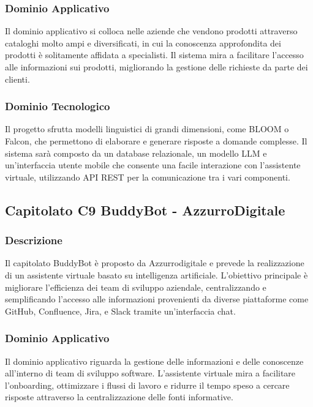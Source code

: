 \documentclass{article}
\begin{document}
\subsubsection{Dominio Applicativo}
Il dominio applicativo si colloca nelle aziende che vendono prodotti attraverso 
cataloghi molto ampi e diversificati, in cui la conoscenza approfondita dei prodotti è 
solitamente affidata a specialisti. Il sistema mira a facilitare l'accesso alle informazioni sui prodotti, 
migliorando la gestione delle richieste da parte dei clienti.

\subsubsection{Dominio Tecnologico}
Il progetto sfrutta modelli linguistici di grandi dimensioni, 
come BLOOM o Falcon, che permettono di elaborare e generare risposte a domande complesse. 
Il sistema sarà composto da un database relazionale, un modello LLM e un’interfaccia 
utente mobile che consente una facile interazione con l'assistente virtuale, 
utilizzando API REST per la comunicazione tra i vari componenti.

\subsection{Capitolato C9 BuddyBot - AzzurroDigitale}

\subsubsection{Descrizione}
Il capitolato BuddyBot è proposto da Azzurrodigitale e prevede la realizzazione 
di un assistente virtuale basato su intelligenza artificiale. 
L'obiettivo principale è migliorare l'efficienza dei team di sviluppo aziendale, 
centralizzando e semplificando l'accesso alle informazioni provenienti da diverse piattaforme come GitHub, 
Confluence, Jira, e Slack tramite un'interfaccia chat.

\subsubsection{Dominio Applicativo}
Il dominio applicativo riguarda la gestione delle informazioni e 
delle conoscenze all'interno di team di sviluppo software. 
L'assistente virtuale mira a facilitare l'onboarding, ottimizzare i flussi di lavoro e ridurre 
il tempo speso a cercare risposte attraverso la centralizzazione delle fonti informative.
\end{document}
